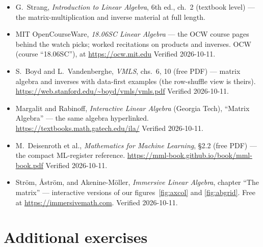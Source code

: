 \begin{itemize}
\item G.~Strang, \emph{Introduction to Linear Algebra}, 6th ed., ch.~2
(textbook level) --- the matrix-multiplication and inverse material at
full length.
\item MIT OpenCourseWare, \emph{18.06SC Linear Algebra} --- the OCW
course pages behind the watch picks; worked recitations on products
and inverses. \newline
OCW (course ``18.06SC''), at \url{https://ocw.mit.edu}
Verified 2026-10-11.
\item S.~Boyd and L.~Vandenberghe, \emph{VMLS}, chs.~6, 10 (free PDF) ---
matrix algebra and inverses with data-first examples (the row-shuffle
view is theirs). \newline
\url{https://web.stanford.edu/~boyd/vmls/vmls.pdf}
Verified 2026-10-11.
\item Margalit and Rabinoff, \emph{Interactive Linear Algebra} (Georgia
Tech), ``Matrix Algebra'' --- the same algebra hyperlinked.\newline
\url{https://textbooks.math.gatech.edu/ila/}
Verified 2026-10-11.
\item M.~Deisenroth et al., \emph{Mathematics for Machine Learning},
\S2.2 (free PDF) --- the compact ML-register reference.\newline
\url{https://mml-book.github.io/book/mml-book.pdf}
Verified 2026-10-11.
\item Str\"om, \AA str\"om, and Akenine-M\"oller, \emph{Immersive Linear
Algebra}, chapter ``The matrix'' --- interactive versions of our
figures~\ref{fig:axcol} and \ref{fig:abgrid}. Free at
\url{https://immersivemath.com}. Verified 2026-10-11.
\end{itemize}

\section*{Additional exercises}

